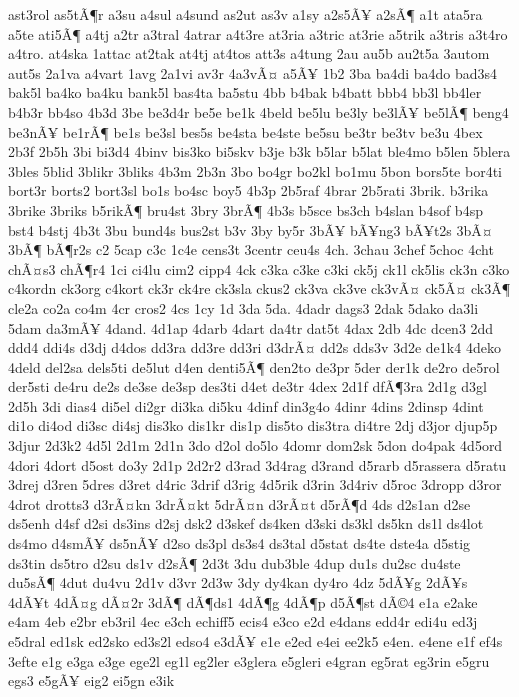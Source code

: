 {ast3rol
as5tÃ¶r
a3su
a4sul
a4sund
as2ut
as3v
a1sy
a2s5Ã¥
a2sÃ¶
a1t
ata5ra
a5te
ati5Ã¶
a4tj
a2tr
a3tral
4atrar
a4t3re
at3ria
a3tric
at3rie
a5trik
a3tris
a3t4ro
a4tro.
at4ska
1attac
at2tak
at4tj
at4tos
att3s
a4tung
2au
au5b
au2t5a
3autom
aut5s
2a1va
a4vart
1avg
2a1vi
av3r
4a3vÃ¤
a5Ã¥
1b2
3ba
ba4di
ba4do
bad3s4
bak5l
ba4ko
ba4ku
bank5l
bas4ta
ba5stu
4bb
b4bak
b4batt
bbb4
bb3l
bb4ler
b4b3r
bb4so
4b3d
3be
be3d4r
be5e
be1k
4beld
be5lu
be3ly
be3lÃ¥
be5lÃ¶
beng4
be3nÃ¥
be1rÃ¶
be1s
be3sl
bes5s
be4sta
be4ste
be5su
be3tr
be3tv
be3u
4bex
2b3f
2b5h
3bi
bi3d4
4binv
bis3ko
bi5skv
b3je
b3k
b5lar
b5lat
ble4mo
b5len
5blera
3bles
5blid
3blikr
3bliks
4b3m
2b3n
3bo
bo4gr
bo2kl
bo1mu
5bon
bors5te
bor4ti
bort3r
borts2
bort3sl
bo1s
bo4sc
boy5
4b3p
2b5raf
4brar
2b5rati
3brik.
b3rika
3brike
3briks
b5rikÃ¶
bru4st
3bry
3brÃ¶
4b3s
b5sce
bs3ch
b4slan
b4sof
b4sp
bst4
b4stj
4b3t
3bu
bund4s
bus2st
b3v
3by
by5r
3bÃ¥
bÃ¥ng3
bÃ¥t2s
3bÃ¤
3bÃ¶
bÃ¶r2s
c2
5cap
c3c
1c4e
cens3t
3centr
ceu4s
4ch.
3chau
3chef
5choc
4cht
chÃ¤s3
chÃ¶r4
1ci
ci4lu
cim2
cipp4
4ck
c3ka
c3ke
c3ki
ck5j
ck1l
ck5lis
ck3n
c3ko
c4kordn
ck3org
c4kort
ck3r
ck4re
ck3sla
ckus2
ck3va
ck3ve
ck3vÃ¤
ck5Ã¤
ck3Ã¶
cle2a
co2a
co4m
4cr
cros2
4cs
1cy
1d
3da
5da.
4dadr
dags3
2dak
5dako
da3li
5dam
da3mÃ¥
4dand.
4d1ap
4darb
4dart
da4tr
dat5t
4dax
2db
4dc
dcen3
2dd
ddd4
ddi4s
d3dj
d4dos
dd3ra
dd3re
dd3ri
d3drÃ¤
dd2s
dds3v
3d2e
de1k4
4deko
4deld
del2sa
dels5ti
de5lut
d4en
denti5Ã¶
den2to
de3pr
5der
der1k
de2ro
de5rol
der5sti
de4ru
de2s
de3se
de3sp
des3ti
d4et
de3tr
4dex
2d1f
dfÃ¶3ra
2d1g
d3gl
2d5h
3di
dias4
di5el
di2gr
di3ka
di5ku
4dinf
din3g4o
4dinr
4dins
2dinsp
4dint
di1o
di4od
di3sc
di4sj
dis3ko
dis1kr
dis1p
dis5to
dis3tra
di4tre
2dj
d3jor
djup5p
3djur
2d3k2
4d5l
2d1m
2d1n
3do
d2ol
do5lo
4domr
dom2sk
5don
do4pak
4d5ord
4dori
4dort
d5ost
do3y
2d1p
2d2r2
d3rad
3d4rag
d3rand
d5rarb
d5rassera
d5ratu
3drej
d3ren
5dres
d3ret
d4ric
3drif
d3rig
4d5rik
d3rin
3d4riv
d5roc
3dropp
d3ror
4drot
drotts3
d3rÃ¤kn
3drÃ¤kt
5drÃ¤n
d3rÃ¤t
d5rÃ¶d
4ds
d2s1an
d2se
ds5enh
d4sf
d2si
ds3ins
d2sj
dsk2
d3skef
ds4ken
d3ski
ds3kl
ds5kn
ds1l
ds4lot
ds4mo
d4smÃ¥
ds5nÃ¥
d2so
ds3pl
ds3s4
ds3tal
d5stat
ds4te
dste4a
d5stig
ds3tin
ds5tro
d2su
ds1v
d2sÃ¶
2d3t
3du
dub3ble
4dup
du1s
du2sc
du4ste
du5sÃ¶
4dut
du4vu
2d1v
d3vr
2d3w
3dy
dy4kan
dy4ro
4dz
5dÃ¥g
2dÃ¥s
4dÃ¥t
4dÃ¤g
dÃ¤2r
3dÃ¶
dÃ¶ds1
4dÃ¶g
4dÃ¶p
d5Ã¶st
dÃ©4
e1a
e2ake
e4am
4eb
e2br
eb3ril
4ec
e3ch
echiff5
ecis4
e3co
e2d
e4dans
edd4r
edi4u
ed3j
e5dral
ed1sk
ed2sko
ed3s2l
edso4
e3dÃ¥
e1e
e2ed
e4ei
ee2k5
e4en.
e4ene
e1f
ef4s
3efte
e1g
e3ga
e3ge
ege2l
eg1l
eg2ler
e3glera
e5gleri
e4gran
eg5rat
eg3rin
e5gru
egs3
e5gÃ¥
eig2
ei5gn
e3ik
}
